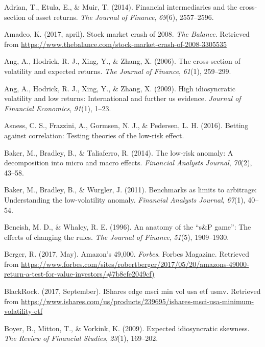 \documentclass[12pt,twoside]{reedthesis}
\theoremstyle{definition}
\theoremstyle{definition}
\theoremstyle{definition}
\theoremstyle{remark}
\begin{document}
\hypertarget{refs}{}
\hypertarget{ref-adrian2014}{}
Adrian, T., Etula, E., \& Muir, T. (2014). Financial intermediaries and
the cross-section of asset returns. \emph{The Journal of Finance},
\emph{69}(6), 2557--2596.

\hypertarget{ref-amadeo2017}{}
Amadeo, K. (2017, april). Stock market crash of 2008. \emph{The
Balance}. Retrieved from
\url{https://www.thebalance.com/stock-market-crash-of-2008-3305535}

\hypertarget{ref-ang2006}{}
Ang, A., Hodrick, R. J., Xing, Y., \& Zhang, X. (2006). The
cross-section of volatility and expected returns. \emph{The Journal of
Finance}, \emph{61}(1), 259--299.

\hypertarget{ref-ang2009}{}
Ang, A., Hodrick, R. J., Xing, Y., \& Zhang, X. (2009). High
idiosyncratic volatility and low returns: International and further us
evidence. \emph{Journal of Financial Economics}, \emph{91}(1), 1--23.

\hypertarget{ref-asness2016}{}
Asness, C. S., Frazzini, A., Gormsen, N. J., \& Pedersen, L. H. (2016).
Betting against correlation: Testing theories of the low-risk effect.

\hypertarget{ref-baker2014}{}
Baker, M., Bradley, B., \& Taliaferro, R. (2014). The low-risk anomaly:
A decomposition into micro and macro effects. \emph{Financial Analysts
Journal}, \emph{70}(2), 43--58.

\hypertarget{ref-baker2011}{}
Baker, M., Bradley, B., \& Wurgler, J. (2011). Benchmarks as limits to
arbitrage: Understanding the low-volatility anomaly. \emph{Financial
Analysts Journal}, \emph{67}(1), 40--54.

\hypertarget{ref-beneish1996}{}
Beneish, M. D., \& Whaley, R. E. (1996). An anatomy of the ``s\&P
game'': The effects of changing the rules. \emph{The Journal of
Finance}, \emph{51}(5), 1909--1930.

\hypertarget{ref-berger2017}{}
Berger, R. (2017, May). Amazon's 49,000. \emph{Forbes}. Forbes Magazine.
Retrieved from
\url{https://www.forbes.com/sites/robertberger/2017/05/20/amazons-49000-return-a-test-for-value-investors/\#7b8efe2049cf)}

\hypertarget{ref-blackrock2017}{}
BlackRock. (2017, September). IShares edge msci min vol usa etf
\textbar{} usmv. Retrieved from
\url{https://www.ishares.com/us/products/239695/ishares-msci-usa-minimum-volatility-etf}

\hypertarget{ref-boyer2009}{}
Boyer, B., Mitton, T., \& Vorkink, K. (2009). Expected idiosyncratic
skewness. \emph{The Review of Financial Studies}, \emph{23}(1),
169--202.
\end{document}
